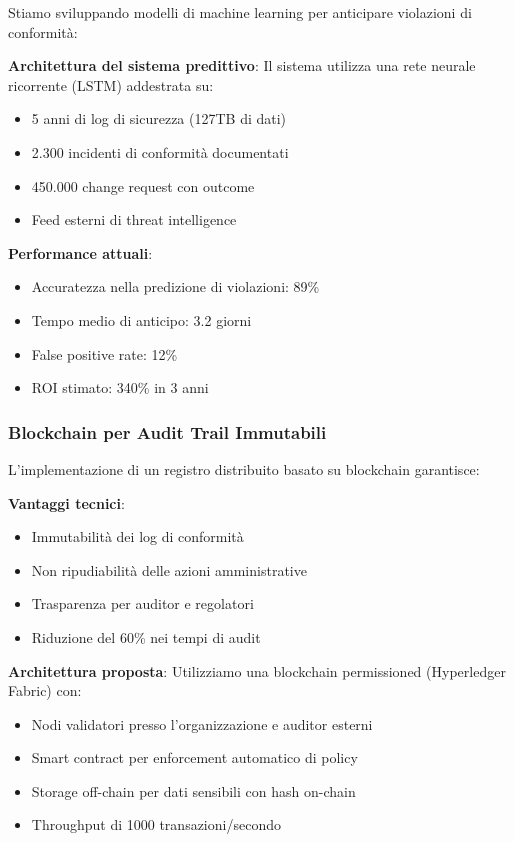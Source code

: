 Stiamo sviluppando modelli di machine learning per anticipare violazioni di conformità:

\textbf{Architettura del sistema predittivo}:
Il sistema utilizza una rete neurale ricorrente (LSTM) addestrata su:
\begin{itemize}
    \item 5 anni di log di sicurezza (127TB di dati)
    \item 2.300 incidenti di conformità documentati
    \item 450.000 change request con outcome
    \item Feed esterni di threat intelligence
\end{itemize}

\textbf{Performance attuali}:
\begin{itemize}
    \item Accuratezza nella predizione di violazioni: 89\%
    \item Tempo medio di anticipo: 3.2 giorni
    \item False positive rate: 12\%
    \item ROI stimato: 340\% in 3 anni
\end{itemize}

\subsubsection{Blockchain per Audit Trail Immutabili}

L'implementazione di un registro distribuito basato su blockchain garantisce:

\textbf{Vantaggi tecnici}:
\begin{itemize}
    \item Immutabilità dei log di conformità
    \item Non ripudiabilità delle azioni amministrative
    \item Trasparenza per auditor e regolatori
    \item Riduzione del 60\% nei tempi di audit
\end{itemize}

\textbf{Architettura proposta}:
Utilizziamo una blockchain permissioned (Hyperledger Fabric) con:
\begin{itemize}
    \item Nodi validatori presso l'organizzazione e auditor esterni
    \item Smart contract per enforcement automatico di policy
    \item Storage off-chain per dati sensibili con hash on-chain
    \item Throughput di 1000 transazioni/secondo
\end{itemize}

